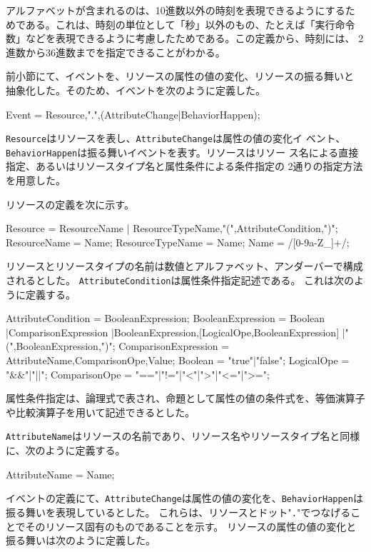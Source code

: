 アルファベットが含まれるのは、10進数以外の時刻を表現できるようにするた
めである。これは、時刻の単位として「秒」以外のもの、たとえば「実行命令
  数」などを表現できるように考慮したためである。この定義から、時刻には、
2進数から36進数までを指定できることがわかる。

前小節にて、イベントを、リソースの属性の値の変化、リソースの振る舞いと
抽象化した。そのため、イベントを次のように定義した。

\begin{EBNF}
Event = Resource,".",(AttributeChange|BehaviorHappen);
\end{EBNF}

{\tt Resource}はリソースを表し、{\tt AttributeChange}は属性の値の変化イ
ベント、{\tt BehaviorHappen}は振る舞いイベントを表す。リソースはリソー
ス名による直接指定、あるいはリソースタイプ名と属性条件による条件指定の
2通りの指定方法を用意した。

リソースの定義を次に示す。

\begin{EBNF}
Resource = ResourceName
         | ResourceTypeName,"(",AttributeCondition,")";
ResourceName = Name;
ResourceTypeName = Name;
Name = /[0-9a-Z_]+/;
\end{EBNF}

リソースとリソースタイプの名前は数値とアルファベット、アンダーバーで構成されるとした。
{\tt AttributeCondition}は属性条件指定記述である。
これは次のように定義する。

\begin{EBNF}
AttributeCondition = BooleanExpression;
BooleanExpression = Boolean
   |ComparisonExpression
   |BooleanExpression,[{LogicalOpe,BooleanExpression}]
   |"(",BooleanExpression,")";
ComparisonExpression = AttributeName,ComparisonOpe,Value;
Boolean = "true"|"false";
LogicalOpe = "&&"|"||";
ComparisonOpe = "=="|"!="|"<"|">"|"<="|">=";
\end{EBNF}

属性条件指定は、論理式で表され、命題として属性の値の条件式を、等価演算子や比較演算子を用いて記述できるとした。

{\tt AttributeName}はリソースの名前であり、リソース名やリソースタイプ名と同様に、次のように定義する。

\begin{EBNF}
AttributeName = Name;
\end{EBNF}

イベントの定義にて、\verb|AttributeChange|は属性の値の変化を、\verb|BehaviorHappen|は振る舞いを表現しているとした。
これらは、リソースとドット"\verb|.|"でつなげることでそのリソース固有のものであることを示す。
リソースの属性の値の変化と振る舞いは次のように定義した。

